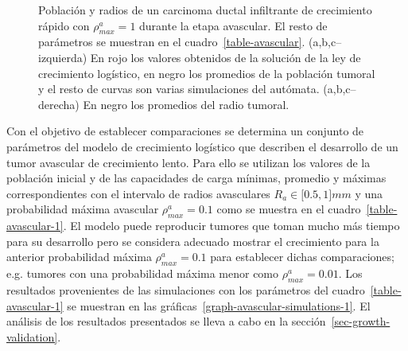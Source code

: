 \begin{figure}[p]
\begin{center}
\end{center}\vspace*{-0.6cm}
\caption[Poblaci\'on y radios de un carcinoma ductal infiltrante de crecimiento r\'apido con $\rho_{max}^a=1$ durante la etapa avascular]{Poblaci\'on y radios de un carcinoma ductal infiltrante de crecimiento r\'apido con $\rho_{max}^a=1$ durante la etapa avascular. El resto de par\'ametros se muestran en el cuadro~\ref{table-avascular}. (a,b,c--izquierda) En rojo los valores obtenidos de la soluci\'on de la ley de crecimiento log\'istico, en negro los promedios de la poblaci\'on tumoral y el resto de curvas son varias simulaciones del aut\'omata. (a,b,c--derecha) En negro los promedios del radio tumoral.}
\label{graph-avascular-simulations}
\end{figure}

Con el objetivo de establecer comparaciones se determina un conjunto de par\'ametros del modelo de crecimiento log\'istico que describen el desarrollo de un tumor avascular de crecimiento lento. Para ello se utilizan los valores de la poblaci\'on inicial y de las capacidades de carga m\'inimas, promedio y m\'aximas correspondientes con el intervalo de radios avasculares $R_a \in [0$.$5, 1]mm$ y una probabilidad m\'axima avascular $\rho_{max}^a=0$.$1$ como se muestra en el cuadro~\ref{table-avascular-1}. El modelo puede reproducir tumores que toman mucho m\'as tiempo para su desarrollo pero se considera adecuado mostrar el crecimiento para la anterior probabilidad m\'axima $\rho_{max}^a=0$.$1$ para establecer dichas comparaciones; e.g. tumores con una probabilidad m\'axima menor como $\rho_{max}^a=0$.$01$. Los resultados provenientes de las simulaciones con los par\'ametros del cuadro~\ref{table-avascular-1} se muestran en las gr\'aficas~\ref{graph-avascular-simulations-1}. El an\'alisis de los resultados presentados se lleva a cabo en la secci\'on~\ref{sec-growth-validation}.
\begin{table}[!ht]
\begin{center}
\vspace*{-0.6cm}
\end{center}
\caption[Par\'ametros del desarrollo de un carcinoma ductal infiltrante de crecimiento lento durante la etapa avascular]{Par\'ametros del desarrollo de un carcinoma ductal infiltrante de crecimiento lento durante la etapa avascular.}
\label{table-avascular-1}
\end{table}

